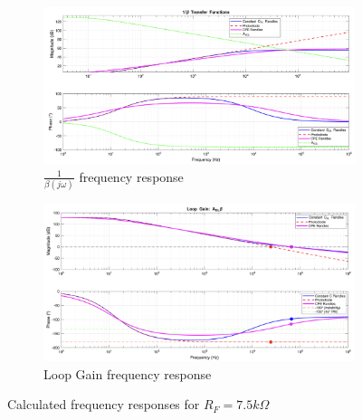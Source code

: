 \begin{figure}[H]
    \centering
    \begin{subfigure}[b]{0.5\textwidth}
        \centering
        \includegraphics[width=\textwidth]{MatLabBeta_7500.png}
        \caption{$\frac{1}{\beta(j\omega)}$ frequency response}
        \label{fig:matlab_beta_7.5}
    \end{subfigure}\hfill
    \begin{subfigure}[b]{0.5\textwidth}
        \centering
        \includegraphics[width=\textwidth]{MatLabLG_7500.png}
        \caption{Loop Gain frequency response}
        \label{fig:matlab_cl_7.5}
    \end{subfigure}
    \caption{Calculated frequency responses for $R_F=7.5k\Omega$}
    \label{fig:matlab_7.5}
\end{figure}

